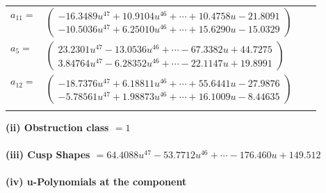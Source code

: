 \documentclass[1p]{elsarticle_modified}
\theoremstyle{definition}
\begin{document}
\begin{tabular}{m{7pt} m{180pt} m{7pt} m{180pt} }
\flushright $a_{11}=$&$\begin{pmatrix}-16.3489 u^{47}+10.9104 u^{46}+\cdots+10.4758 u-21.8091\\-10.5036 u^{47}+6.25010 u^{46}+\cdots+15.6290 u-15.0329\end{pmatrix}$ \\
\flushright $a_{5}=$&$\begin{pmatrix}23.2301 u^{47}-13.0536 u^{46}+\cdots-67.3382 u+44.7275\\3.84764 u^{47}-6.28352 u^{46}+\cdots-22.1147 u+19.8991\end{pmatrix}$ \\
\flushright $a_{12}=$&$\begin{pmatrix}-18.7376 u^{47}+6.18811 u^{46}+\cdots+55.6441 u-27.9876\\-5.78561 u^{47}+1.98873 u^{46}+\cdots+16.1009 u-8.44635\end{pmatrix}$\\&\end{tabular}
\flushleft \textbf{(ii) Obstruction class $= 1$}\\~\\
\flushleft \textbf{(iii) Cusp Shapes $= 64.4088 u^{47}-53.7712 u^{46}+\cdots-176.460 u+149.512$}\\~\\
\newpage\renewcommand{\arraystretch}{1}
\flushleft \textbf{(iv) u-Polynomials at the component}\newline \\
\end{document}
